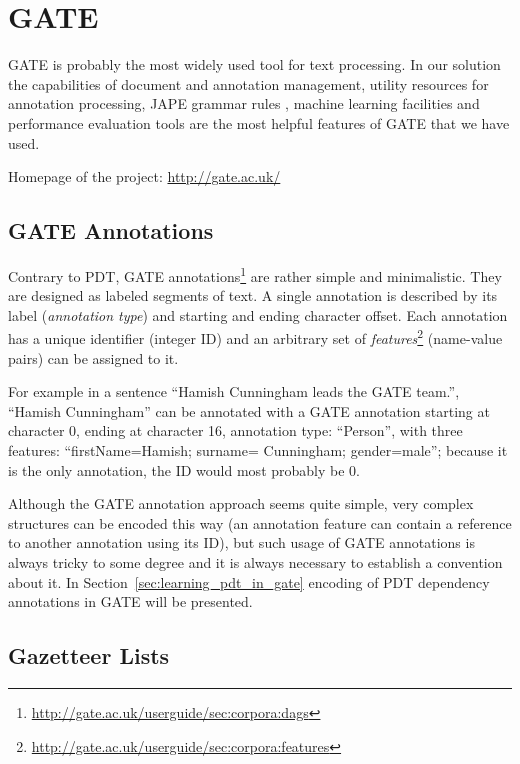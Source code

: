 \section{GATE} \label{sec:third_gate}

GATE \citep{biblio:GATE_ACL2002} is probably the most widely used tool for text processing. In our solution the capabilities of document and annotation management, utility resources for annotation processing, JAPE grammar rules \citep{Cunningham00jape:a}, machine learning facilities and performance evaluation tools are the most helpful features of GATE that we have used.

\medskip
Homepage of the project: \url{http://gate.ac.uk/}

\subsection{GATE Annotations} \label{sec:third_gate_annotations}
Contrary to PDT, GATE annotations\footnote{\url{http://gate.ac.uk/userguide/sec:corpora:dags}} are rather simple and minimalistic. They are designed as labeled segments of text. A single annotation is described by its label (\emph{annotation type}) and starting and ending character offset. Each annotation has a unique identifier (integer ID) and an arbitrary set of \emph{features}\footnote{\url{http://gate.ac.uk/userguide/sec:corpora:features}} (name-value pairs) can be assigned to it. 

For example in a sentence ``Hamish Cunningham leads the GATE team.'', ``Hamish Cunningham'' can be annotated with a GATE annotation starting at character 0, ending at character 16, annotation type: ``Person'', with three features: ``firstName=Hamish; surname= Cunningham; gender=male''; because it is the only annotation, the ID would most probably be 0.

Although the GATE annotation approach seems quite simple, very complex structures can be encoded this way (an annotation feature can contain a reference to another annotation using its ID), but such usage of GATE annotations is always tricky to some degree and it is always necessary to establish a convention about it. In Section~\ref{sec:learning_pdt_in_gate} encoding of PDT dependency annotations in GATE will be presented.


\subsection{Gazetteer Lists} \label{sec:third_gate_gaze}

